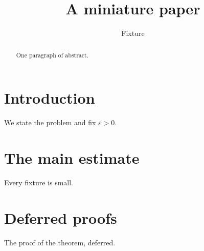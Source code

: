 \documentclass{article}
\newcommand{\eps}{\varepsilon}
\begin{document}
\title{A miniature paper}
\author{Fixture}
\maketitle

\begin{abstract}
One paragraph of abstract.
\end{abstract}

\section{Introduction}
\label{sec:intro}
We state the problem and fix $\eps > 0$.

\section{The main estimate}
\label{sec:main}
\begin{theorem}
Every fixture is small.
\end{theorem}

\appendix

\section{Deferred proofs}
\label{sec:appendix}
The proof of the theorem, deferred.



\end{document}
